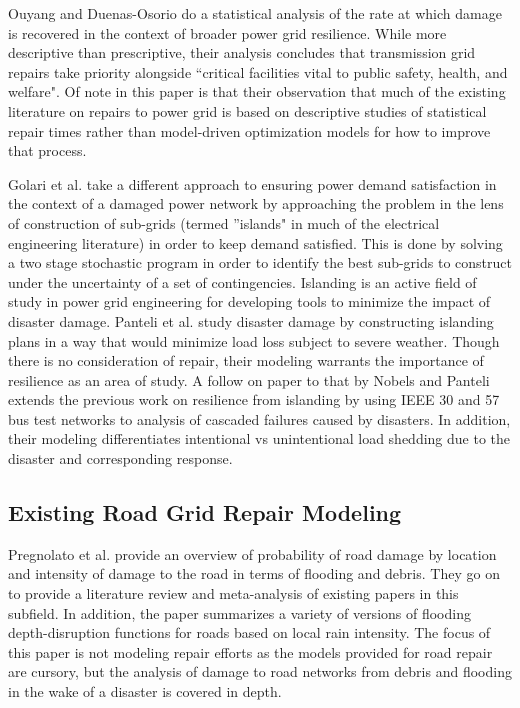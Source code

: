 Ouyang and Duenas-Osorio \cite{OuyangEA2014} do a statistical analysis of the rate at which damage is recovered in the context of broader power grid resilience. While more descriptive than prescriptive, their analysis concludes that transmission grid repairs take priority alongside ``critical facilities vital to public safety, health, and welfare". Of note in this paper is that their observation that much of the existing literature on repairs to power grid is based on descriptive studies of statistical repair times rather than model-driven optimization models for how to improve that process.

Golari et al. \cite{GolariEA2014} take a different approach to ensuring power demand satisfaction in the context of a damaged power network by approaching the problem in the lens of construction of sub-grids (termed ''islands" in much of the electrical engineering literature) in order to keep demand satisfied. This is done by solving a two stage stochastic program in order to identify the best sub-grids to construct under the uncertainty of a set of contingencies. Islanding is an active field of study in power grid engineering for developing tools to minimize the impact of disaster damage. Panteli et al. \cite{Panteli2016} study disaster damage by constructing islanding plans in a way that would minimize load loss subject to severe weather. Though there is no consideration of repair, their modeling warrants the importance of resilience as an area of study.  A follow on paper to that by Nobels and Panteli \cite{NobelsEA2019} extends the previous work on resilience from islanding  by using IEEE 30 and 57 bus test networks to analysis of cascaded failures caused by disasters. In addition, their modeling differentiates intentional vs unintentional load shedding due to the disaster and corresponding response.
\subsection{Existing Road Grid Repair Modeling}
Pregnolato et al. \cite{PregnolatoEA2017} provide an overview of probability of road damage by location and intensity of damage to the road in terms of flooding and debris. They go on to provide a literature review and meta-analysis of existing papers in this subfield. In addition, the paper summarizes a variety of versions of flooding depth-disruption functions for roads based on local rain intensity. The focus of this paper is not modeling repair efforts as the models provided for road repair are cursory, but the analysis of damage to road networks from debris and flooding in the wake of a disaster is covered in depth.

